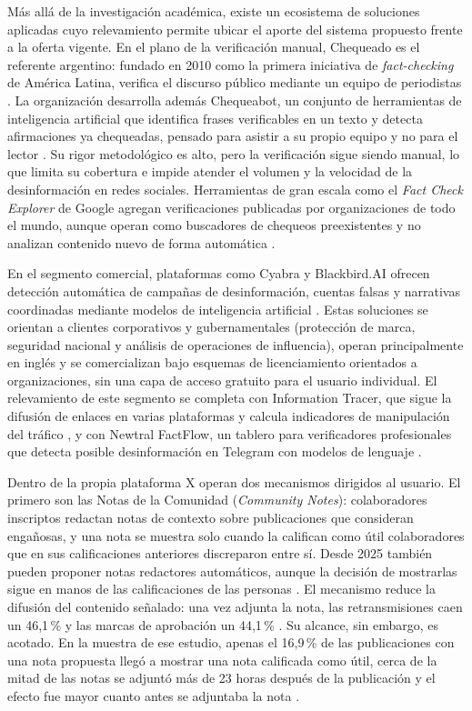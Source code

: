 Más allá de la investigación académica, existe un ecosistema de soluciones aplicadas cuyo relevamiento permite ubicar el aporte del sistema propuesto frente a la oferta vigente. En el plano de la verificación manual, Chequeado es el referente argentino: fundado en 2010 como la primera iniciativa de \textit{fact-checking} de América Latina, verifica el discurso público mediante un equipo de periodistas \parencite{Chequeado2026}. La organización desarrolla además Chequeabot, un conjunto de herramientas de inteligencia artificial que identifica frases verificables en un texto y detecta afirmaciones ya chequeadas, pensado para asistir a su propio equipo y no para el lector \parencite{Chequeabot2026}. Su rigor metodológico es alto, pero la verificación sigue siendo manual, lo que limita su cobertura e impide atender el volumen y la velocidad de la desinformación en redes sociales. Herramientas de gran escala como el \textit{Fact Check Explorer} de Google agregan verificaciones publicadas por organizaciones de todo el mundo, aunque operan como buscadores de chequeos preexistentes y no analizan contenido nuevo de forma automática \parencite{GoogleFactCheck2026}.

En el segmento comercial, plataformas como Cyabra y Blackbird.AI ofrecen detección automática de campañas de desinformación, cuentas falsas y narrativas coordinadas mediante modelos de inteligencia artificial \parencite{Cyabra2026,BlackbirdAI2026}. Estas soluciones se orientan a clientes corporativos y gubernamentales (protección de marca, seguridad nacional y análisis de operaciones de influencia), operan principalmente en inglés y se comercializan bajo esquemas de licenciamiento orientados a organizaciones, sin una capa de acceso gratuito para el usuario individual. El relevamiento de este segmento se completa con Information Tracer, que sigue la difusión de enlaces en varias plataformas y calcula indicadores de manipulación del tráfico \parencite{ChenEtAl2021}, y con Newtral FactFlow, un tablero para verificadores profesionales que detecta posible desinformación en Telegram con modelos de lenguaje \parencite{JournalismAINewtral2024}.

Dentro de la propia plataforma X operan dos mecanismos dirigidos al usuario. El primero son las Notas de la Comunidad (\textit{Community Notes}): colaboradores inscriptos redactan notas de contexto sobre publicaciones que consideran engañosas, y una nota se muestra solo cuando la califican como útil colaboradores que en sus calificaciones anteriores discreparon entre sí. Desde 2025 también pueden proponer notas redactores automáticos, aunque la decisión de mostrarlas sigue en manos de las calificaciones de las personas \parencite{XCommunityNotes2026}. El mecanismo reduce la difusión del contenido señalado: una vez adjunta la nota, las retransmisiones caen un 46,1\,\% y las marcas de aprobación un 44,1\,\% \parencite{SlaughterEtAl2025}. Su alcance, sin embargo, es acotado. En la muestra de ese estudio, apenas el 16,9\,\% de las publicaciones con una nota propuesta llegó a mostrar una nota calificada como útil, cerca de la mitad de las notas se adjuntó más de 23 horas después de la publicación y el efecto fue mayor cuanto antes se adjuntaba la nota \parencite{SlaughterEtAl2025}.

